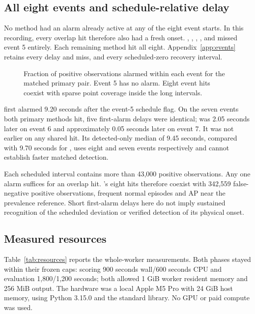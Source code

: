 \subsection{All eight events and schedule-relative delay}
No method had an alarm already active at any of the eight event starts. In this recording, every overlap hit therefore also had a fresh onset. , , , ,  and  missed event 5 entirely. Each remaining method hit all eight. Appendix~\ref{app:events} retains every delay and miss, and every scheduled-zero recovery interval.

\begin{figure}[htbp]\centering

\caption{Fraction of positive observations alarmed within each event for the matched primary pair. Event 5 has no  alarm. Eight  event hits coexist with sparse point coverage inside the long intervals.}\label{fig:eventcoverage}
\end{figure}

 first alarmed 9.20 seconds after the event-5 schedule flag. On the seven events both primary methods hit, five first-alarm delays were identical;  was 2.05 seconds later on event 6 and approximately 0.05 seconds later on event 7. It was not earlier on any shared hit. Its detected-only median of 9.45 seconds, compared with 9.70 seconds for , uses eight and seven events respectively and cannot establish faster matched detection.

Each scheduled interval contains more than 43,000 positive observations. Any one alarm suffices for an overlap hit. 's eight hits therefore coexist with 342,559 false-negative positive observations, frequent normal episodes and AP near the prevalence reference. Short first-alarm delays here do not imply sustained recognition of the scheduled deviation or verified detection of its physical onset.

\subsection{Measured resources}
Table~\ref{tab:resources} reports the whole-worker measurements. Both phases stayed within their frozen caps: scoring 900 seconds wall/600 seconds CPU and evaluation 1,800/1,200 seconds; both allowed 1 GiB worker resident memory and 256 MiB output. The hardware was a local Apple M5 Pro with 24 GiB host memory, using Python 3.15.0 and the standard library. No GPU or paid compute was used.

